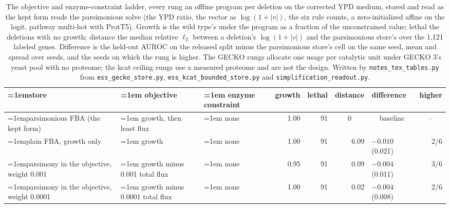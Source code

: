 \begin{table}[H]
  \centering
  \footnotesize
  \setlength{\tabcolsep}{2.5pt}
  \caption[Rounds 113 and 114: the offline stores as the module's columns]{The objective and enzyme-constraint ladder, every rung an offline program per deletion on the corrected YPD medium, stored and read as the kept form reads the parsimonious solve (the YPD ratio, the vector as $\log(1+|v|)$, the six rule counts, a zero-initialized affine on the logit, pathway multi-hot with ProtT5). Growth is the wild type's under the program as a fraction of the unconstrained value; lethal the deletions with no growth; distance the median relative $\ell_2$ between a deletion's $\log(1+|v|)$ and the parsimonious store's over the 1,121 labeled genes. Difference is the held-out AUROC on the released split minus the parsimonious store's cell on the same seed, mean and spread over seeds, and the seeds on which the rung is higher. The GECKO rungs allocate one usage per catalytic unit under GECKO 3's yeast pool with no proteome; the kcat ceiling rungs use a measured proteome and are not the design. Written by \texttt{notes\_tex\_tables.py} from \texttt{ess\_gecko\_store.py}, \texttt{ess\_kcat\_bounded\_store.py} and \texttt{simplification\_readout.py}.}
  \label{tab:store-ladder}
  \begin{tabular}{@{}>{\raggedright\hangindent=1em\hangafter=1\arraybackslash}p{64.0mm}>{\raggedright\hangindent=1em\hangafter=1\arraybackslash}p{24.6mm}>{\raggedright\hangindent=1em\hangafter=1\arraybackslash}p{24.6mm}rrrlr@{}}
    \hline
    store & objective & enzyme constraint & growth & lethal & distance & difference & higher \\
    \hline
    parsimonious FBA (the kept form) & growth, then least flux & none & 1.00 & 91 & \multicolumn{1}{c}{0} & \multicolumn{1}{c}{baseline} & \multicolumn{1}{c}{--} \\
    plain FBA, growth only & growth & none & 1.00 & 91 & 6.09 & $-0.010$ (0.021) & 2/6 \\
    parsimony in the objective, weight 0.001 & growth minus 0.001 total flux & none & 0.95 & 91 & 0.09 & $-0.004$ (0.011) & 3/6 \\
    parsimony in the objective, weight 0.0001 & growth minus 0.0001 total flux & none & 1.00 & 91 & 0.02 & $-0.004$ (0.008) & 2/6 \\

\end{tabular}
\end{table}
